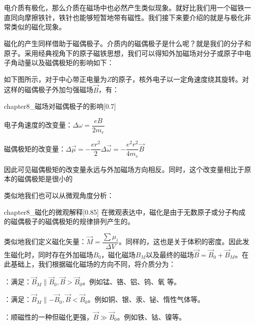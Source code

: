 \section[磁介质的磁化]{}
\subsection[磁化的定义]{}
电介质有极化，那么介质在磁场中也必然产生类似现象。就好比我们用一个磁铁一直同向摩擦铁针，铁针也能够短暂地带有磁性。我们接下来要介绍的就是与极化非常类似的磁化现象。

磁化的产生同样借助于磁偶极子。介质内的磁偶极子是什么呢？就是我们的分子和原子。采用经典视角下的原子磁铁思想，我们可以得知外加磁场对分子或原子中电子角动量以及磁偶极矩的影响如下：
\begin{law}
    如下图所示，对于中心带正电量为$Z$的原子，核外电子以一定角速度绕其旋转。对这样的磁偶极子外加匀强磁场$\vec{B}$，有：
    \begin{singlefigure}[磁场对磁偶极子的影响]{chapter8_磁场对磁偶极子的影响}[0.7]
    \end{singlefigure}
    电子角速度的改变量：$\Delta \omega=\dfrac{eB}{2m_e}$

    磁偶极矩的改变量：$\Delta\vec{\mu}=-\dfrac{er^2}{2}\Delta\vec{\omega}=-\dfrac{e^2 r^2}{4m_e}\vec{B}$

    因此可见磁偶极矩的改变量永远与外加磁场方向相反。同时，这个改变量相比于原本的磁偶极矩是很小的
\end{law}
类似地我们也可以从微观角度分析：
\begin{singlefigure}[磁化的微观解释]{chapter8_磁化的微观解释}[0.85]
    在微观表达中，磁化是由于无数原子或分子构成的磁偶极子的磁偶极矩的规律排列产生的。
\end{singlefigure}

类似地我们定义磁化矢量：$\vec{M}=\dfrac{\sum \mu_i}{\Delta V}$。同样的，这也是关于体积的密度。因此发生磁化时，同时存在外加磁场$B_0$，磁化磁场$B_M$以及最终的磁场$\vec{B}=\vec{B}_0+\vec{B}_M$。在此基础上，我们根据磁化磁场的方向不同，将介质分为：
\begin{Itemize}
    \item {}：满足：$\vec{B}_M\parallel{\vec{B}_0},\vec{B}>\vec{B}_0$。例如锰、铬、铝、钨、氧 等。
    \item {}：满足：$\vec{B}_M\parallel{-\vec{B}_0},\vec{B}<\vec{B}_0$。例如铜、银、汞、铋、惰性气体等。
    \item {}：顺磁性的一种但磁化更强，$\vec{B}\gg\vec{B}_0$。例如铁、钴、镍等。
\end{Itemize}
